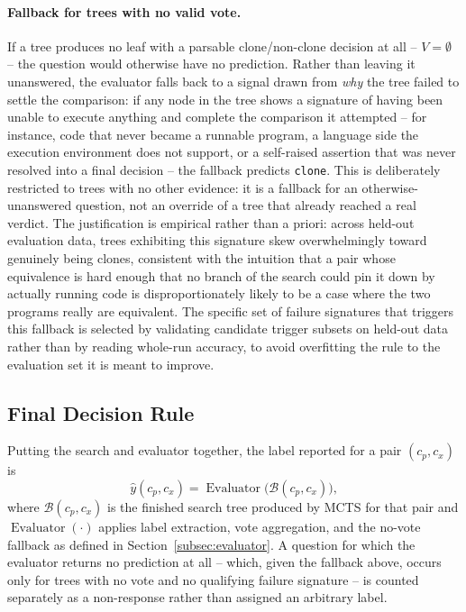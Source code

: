 \paragraph{Fallback for trees with no valid vote.} If a tree produces no
leaf with a parsable clone/non-clone decision at all -- $V = \emptyset$ -- the
question would otherwise have no prediction. Rather than leaving it
unanswered, the evaluator falls back to a signal drawn from \emph{why} the
tree failed to settle the comparison: if any node in the tree shows a
signature of having been unable to execute anything and complete the
comparison it attempted -- for instance, code that never became a runnable
program, a language side the execution environment does not support, or a
self-raised assertion that was never resolved into a final decision -- the
fallback predicts \texttt{clone}. This is deliberately restricted to trees
with no other evidence: it is a fallback for an otherwise-unanswered
question, not an override of a tree that already reached a real verdict. The
justification is empirical rather than a priori: across held-out evaluation
data, trees exhibiting this signature skew overwhelmingly toward genuinely
being clones, consistent with the intuition that a pair whose equivalence is
hard enough that no branch of the search could pin it down by actually
running code is disproportionately likely to be a case where the two
programs really are equivalent. The specific set of failure signatures that
triggers this fallback is selected by validating candidate trigger subsets on
held-out data rather than by reading whole-run accuracy, to avoid overfitting
the rule to the evaluation set it is meant to improve.

\subsection{Final Decision Rule}
\label{subsec:final_decision}

Putting the search and evaluator together, the label reported for a pair
$(c_p,c_x)$ is
\[
    \hat{y}(c_p,c_x) = \operatorname{Evaluator}\bigl(\mathcal{B}(c_p,c_x)\bigr),
\]
where $\mathcal{B}(c_p,c_x)$ is the finished search tree produced by MCTS for
that pair and $\operatorname{Evaluator}(\cdot)$ applies label extraction,
vote aggregation, and the no-vote fallback as defined in
Section~\ref{subsec:evaluator}. A question for which the evaluator returns no
prediction at all -- which, given the fallback above, occurs only for trees
with no vote and no qualifying failure signature -- is counted separately as
a non-response rather than assigned an arbitrary label.

